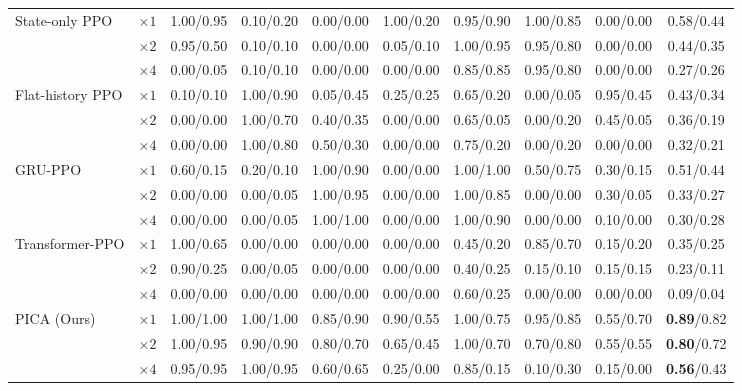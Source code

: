 \documentclass{article}
\begin{document}
\begin{table}[t]
{\begin{tabular}{llcccccccc}
\midrule
\multirow{3}{*}{State-only PPO} & $\times1$ & 1.00/0.95 & 0.10/0.20 & 0.00/0.00 & 1.00/0.20 & 0.95/0.90 & 1.00/0.85 & 0.00/0.00 & 0.58/0.44 \\
 & $\times2$ & 0.95/0.50 & 0.10/0.10 & 0.00/0.00 & 0.05/0.10 & 1.00/0.95 & 0.95/0.80 & 0.00/0.00 & 0.44/0.35 \\
 & $\times4$ & 0.00/0.05 & 0.10/0.10 & 0.00/0.00 & 0.00/0.00 & 0.85/0.85 & 0.95/0.80 & 0.00/0.00 & 0.27/0.26 \\
\midrule
\multirow{3}{*}{Flat-history PPO} & $\times1$ & 0.10/0.10 & 1.00/0.90 & 0.05/0.45 & 0.25/0.25 & 0.65/0.20 & 0.00/0.05 & 0.95/0.45 & 0.43/0.34 \\
 & $\times2$ & 0.00/0.00 & 1.00/0.70 & 0.40/0.35 & 0.00/0.00 & 0.65/0.05 & 0.00/0.20 & 0.45/0.05 & 0.36/0.19 \\
 & $\times4$ & 0.00/0.00 & 1.00/0.80 & 0.50/0.30 & 0.00/0.00 & 0.75/0.20 & 0.00/0.20 & 0.00/0.00 & 0.32/0.21 \\
\midrule
\multirow{3}{*}{GRU-PPO} & $\times1$ & 0.60/0.15 & 0.20/0.10 & 1.00/0.90 & 0.00/0.00 & 1.00/1.00 & 0.50/0.75 & 0.30/0.15 & 0.51/0.44 \\
 & $\times2$ & 0.00/0.00 & 0.00/0.05 & 1.00/0.95 & 0.00/0.00 & 1.00/0.85 & 0.00/0.00 & 0.30/0.05 & 0.33/0.27 \\
 & $\times4$ & 0.00/0.00 & 0.00/0.05 & 1.00/1.00 & 0.00/0.00 & 1.00/0.90 & 0.00/0.00 & 0.10/0.00 & 0.30/0.28 \\
\midrule
\multirow{3}{*}{Transformer-PPO} & $\times1$ & 1.00/0.65 & 0.00/0.00 & 0.00/0.00 & 0.00/0.00 & 0.45/0.20 & 0.85/0.70 & 0.15/0.20 & 0.35/0.25 \\
 & $\times2$ & 0.90/0.25 & 0.00/0.05 & 0.00/0.00 & 0.00/0.00 & 0.40/0.25 & 0.15/0.10 & 0.15/0.15 & 0.23/0.11 \\
 & $\times4$ & 0.00/0.00 & 0.00/0.00 & 0.00/0.00 & 0.00/0.00 & 0.60/0.25 & 0.00/0.00 & 0.00/0.00 & 0.09/0.04 \\
\midrule
\multirow{3}{*}{PICA (Ours)} & $\times1$ & 1.00/1.00 & 1.00/1.00 & 0.85/0.90 & 0.90/0.55 & 1.00/0.75 & 0.95/0.85 & 0.55/0.70 & \textbf{0.89}/0.82 \\
 & $\times2$ & 1.00/0.95 & 0.90/0.90 & 0.80/0.70 & 0.65/0.45 & 1.00/0.70 & 0.70/0.80 & 0.55/0.55 & \textbf{0.80}/0.72 \\
 & $\times4$ & 0.95/0.95 & 1.00/0.95 & 0.60/0.65 & 0.25/0.00 & 0.85/0.15 & 0.10/0.30 & 0.15/0.00 & \textbf{0.56}/0.43 \\
\bottomrule
\end{tabular}}
\end{table}
\end{document}
